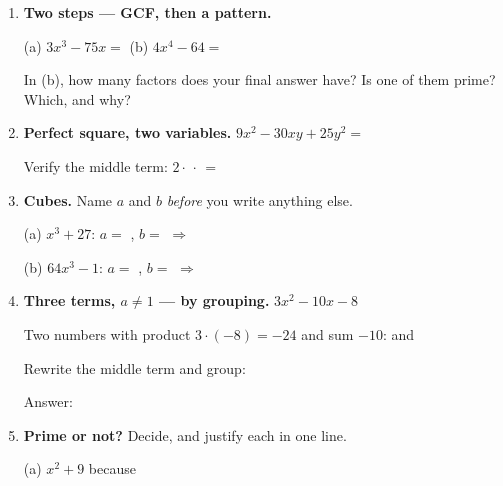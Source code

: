 \documentclass[10pt]{article}
\begin{document}
\begin{tcolorbox}[colback=white, colframe=black!40, title=\textbf{Tier A --- Approaching Proficiency},
    fonttitle=\bfseries, arc=1.5mm, left=3mm, right=3mm, top=2mm, bottom=2mm, breakable]
\begin{enumerate}[leftmargin=1.7em, itemsep=10pt]
  \item \textbf{Two steps --- GCF, then a pattern.}

    \vspace{2pt}
    (a) $3x^3 - 75x = $ \blank{5.0cm} \qquad (b) $4x^4 - 64 = $ \blank{5.0cm}

    \vspace{2pt}
    In (b), how many factors does your final answer have? \blank{1.0cm} \; Is one of them prime?
    Which, and why? \writeline

  \item \textbf{Perfect square, two variables.} $9x^2 - 30xy + 25y^2 = $ \blank{4.6cm}

    \vspace{2pt}
    Verify the middle term: $2 \cdot$ \blank{1.2cm} $\cdot$ \blank{1.2cm} $= $ \blank{1.6cm}

  \item \textbf{Cubes.} Name $a$ and $b$ \emph{before} you write anything else.

    \vspace{3pt}
    (a) $x^3 + 27$: \quad $a = $ \blank{0.9cm}, \; $b = $ \blank{0.9cm} \quad $\Rightarrow$
    \blank{4.6cm}

    \vspace{3pt}
    (b) $64x^3 - 1$: \quad $a = $ \blank{0.9cm}, \; $b = $ \blank{0.9cm} \quad $\Rightarrow$
    \blank{4.6cm}

  \item \textbf{Three terms, $a \ne 1$ --- by grouping.} $3x^2 - 10x - 8$

    \vspace{2pt}
    Two numbers with product $3 \cdot (-8) = -24$ and sum $-10$: \blank{1.2cm} and \blank{1.2cm}

    \vspace{2pt}
    Rewrite the middle term and group: \blank{6.0cm}

    \vspace{2pt}
    Answer: \blank{4.4cm}

  \item \textbf{Prime or not?} Decide, and justify each in one line.

    \vspace{2pt}
    (a) $x^2 + 9$ \quad \blank{1.6cm} \; because \blank{6.0cm}


\end{enumerate}
\end{tcolorbox}
\end{document}
